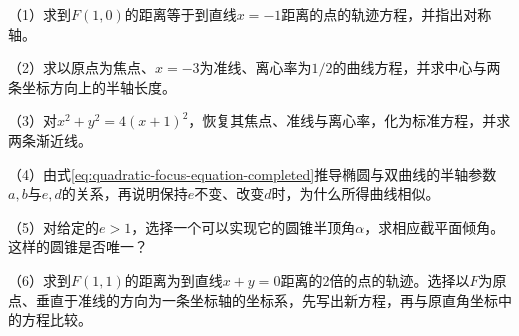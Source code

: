\begin{exercise}
\mbox{}

\begin{samepage}
（1）求到\(F(1,0)\)的距离等于到直线\(x=-1\)距离的点的轨迹方程，并指出对称轴。
\par
\end{samepage}

\begin{samepage}
（2）求以原点为焦点、\(x=-3\)为准线、离心率为\(1/2\)的曲线方程，并求中心与两条坐标方向上的半轴长度。
\par
\end{samepage}

\begin{samepage}
（3）对\(x^2+y^2=4(x+1)^2\)，恢复其焦点、准线与离心率，化为标准方程，并求两条渐近线。
\par
\end{samepage}

\begin{samepage}
（4）由式\eqref{eq:quadratic-focus-equation-completed}推导椭圆与双曲线的半轴参数\(a,b\)与\(e,d\)的关系，再说明保持\(e\)不变、改变\(d\)时，为什么所得曲线相似。
\par
\end{samepage}

\begin{samepage}
（5）对给定的\(e>1\)，选择一个可以实现它的圆锥半顶角\(\alpha\)，求相应截平面倾角。这样的圆锥是否唯一？
\par
\end{samepage}

\begin{samepage}
（6）求到\(F(1,1)\)的距离为到直线\(x+y=0\)距离的\(2\)倍的点的轨迹。选择以\(F\)为原点、垂直于准线的方向为一条坐标轴的坐标系，先写出新方程，再与原直角坐标中的方程比较。
\par
\end{samepage}
\end{exercise}
\newpage
